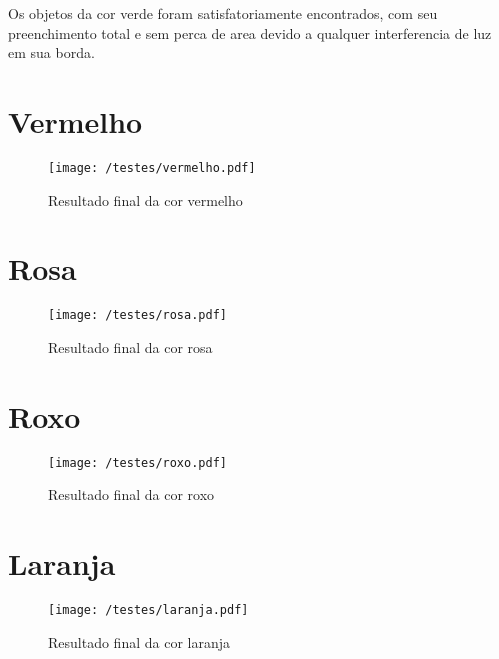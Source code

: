 Os objetos da cor verde foram satisfatoriamente encontrados, com seu preenchimento total e sem perca de area devido a qualquer interferencia de luz em sua borda.	
	
\section{Vermelho}
	\begin{figure}[H]
		\centering
		\texttt{[image: /testes/vermelho.pdf]}
		\caption{Resultado final da cor vermelho}
		\label{disposicaoparte}
	\end{figure}
\section{Rosa}
	\begin{figure}[H]
		\centering
		\texttt{[image: /testes/rosa.pdf]}
		\caption{Resultado final da cor rosa}
		\label{disposicaoparte}
	\end{figure}
\section{Roxo}
	\begin{figure}[H]
		\centering
		\texttt{[image: /testes/roxo.pdf]}
		\caption{Resultado final da cor roxo}
		\label{disposicaoparte}
	\end{figure}


	
\section{Laranja}
	\begin{figure}[H]
		\centering
		\texttt{[image: /testes/laranja.pdf]}
		\caption{Resultado final da cor laranja}
		\label{disposicaoparte}
	\end{figure}
	
